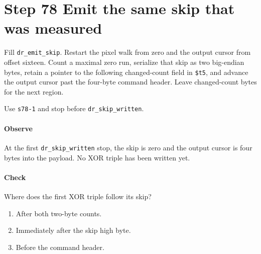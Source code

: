 \section{Step 78 Emit the same skip that was measured}
Fill \texttt{dr\_emit\_skip}. Restart the pixel walk from zero and the output cursor from offset sixteen. Count a maximal zero run, serialize that skip as two big-endian bytes, retain a pointer to the following changed-count field in \texttt{\$t5}, and advance the output cursor past the four-byte command header. Leave changed-count bytes for the next region.

Use \texttt{s78-1} and stop before \texttt{dr\_skip\_written}.

\paragraph{Observe} At the first \texttt{dr\_skip\_written} stop, the skip is zero and the output cursor is four bytes into the payload. No XOR triple has been written yet.

\paragraph{Check} Where does the first XOR triple follow its skip?
\begin{enumerate}[label=\Alph*.]
  \item After both two-byte counts.
  \item Immediately after the skip high byte.
  \item Before the command header.
\end{enumerate}
